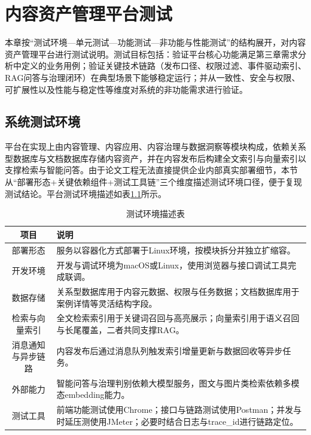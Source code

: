 
\chapter{内容资产管理平台测试}

本章按“测试环境—单元测试—功能测试—非功能与性能测试”的结构展开，对内容资产管理平台进行测试说明。测试目标包括：验证平台核心功能满足第三章需求分析中定义的业务用例；验证关键技术链路（发布口径、权限过滤、事件驱动索引、RAG问答与治理闭环）在典型场景下能够稳定运行；并从一致性、安全与权限、可扩展性以及性能与稳定性等维度对系统的非功能需求进行验证。

\section{系统测试环境}

平台在实现上由内容管理、内容应用、内容治理与数据洞察等模块构成，依赖关系型数据库与文档数据库存储内容资产，并在内容发布后构建全文索引与向量索引以支撑检索与智能问答。由于论文工程无法直接提供企业内部真实部署细节，本节从“部署形态+关键依赖组件+测试工具链”三个维度描述测试环境口径，便于复现测试结论。平台测试环境描述如表\ref{tab:test_env}所示。

\begin{table}[!htbp]
  \centering
  \caption{测试环境描述表}
  \label{tab:test_env}
  \small
  \begin{tabularx}{\linewidth}{c|>{\raggedright\arraybackslash}X}
    \hline
    项目 & 说明 \\ \hline
    部署形态 & 服务以容器化方式部署于Linux环境，按模块拆分并独立扩缩容。 \\ \hline
    开发环境 & 开发与调试环境为macOS或Linux，使用浏览器与接口调试工具完成联调。 \\ \hline
    数据存储 & 关系型数据库用于内容元数据、权限与任务数据；文档数据库用于案例详情等灵活结构字段。 \\ \hline
    检索与向量索引 & 全文检索索引用于关键词召回与高亮展示；向量索引用于语义召回与长尾覆盖，二者共同支撑RAG。 \\ \hline
    消息通知与异步链路 & 内容发布后通过消息队列触发索引增量更新与数据回收等异步任务。 \\ \hline
    外部能力 & 智能问答与治理判别依赖大模型服务，图文与图片类检索依赖多模态embedding能力。 \\ \hline
    测试工具 & 前端功能测试使用Chrome；接口与链路测试使用Postman；并发与时延压测使用JMeter；必要时结合日志与trace\_id进行链路定位。 \\ \hline
  \end{tabularx}
\end{table}

